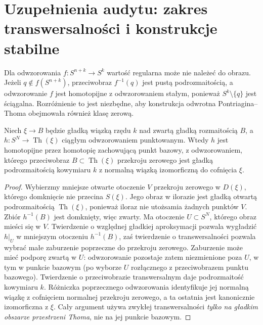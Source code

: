 \section{Uzupełnienia audytu: zakres transwersalności i konstrukcje stabilne}
\begin{uwaga}
Dla odwzorowania $f:S^{n+k}\to S^k$ wartość regularna może nie należeć
do obrazu. Jeżeli $q\notin f(S^{n+k})$, przeciwobraz $f^{-1}(q)$
jest pustą podrozmaitością, a odwzorowanie $f$ jest homotopijne z odwzorowaniem stałym,
ponieważ $S^k\setminus\{q\}$ jest ściągalna. Rozróżnienie
to jest niezbędne, aby konstrukcja odwrotna Pontriagina--Thoma
obejmowała również klasę zerową.
\end{uwaga}

\begin{lemat}
\label{lem:thom-transversal-v9-audyt}
Niech $\xi\to B$ będzie gładką wiązką rzędu $k$ nad zwartą
gładką rozmaitością $B$, a $h:S^N\to\operatorname{Th}(\xi)$
ciągłym odwzorowaniem punktowanym. Wtedy $h$ jest
homotopijne przez homotopię zachowującą punkt bazowy,
z odwzorowaniem, którego przeciwobraz $B\subset\operatorname{Th}(\xi)$
przekroju zerowego jest gładką podrozmaitością
kowymiaru $k$ z normalną wiązką izomorficzną do
cofnięcia $\xi$.
\end{lemat}
\begin{proof}
Wybierzmy mniejsze otwarte otoczenie $V$ przekroju zerowego
w $D(\xi)$, którego domknięcie nie przecina $S(\xi)$.
Jego obraz w ilorazie jest gładką otwartą podrozmaitością
$\operatorname{Th}(\xi)$, ponieważ iloraz nie utożsamia
żadnych punktów $V$. Zbiór $h^{-1}(B)$ jest domknięty,
więc zwarty. Ma otoczenie $U\subset S^N$, którego
obraz mieści się w $V$. Twierdzenie o względnej gładkiej
aproksymacji pozwala wygładzić $h|_U$ w mniejszym
otoczeniu $h^{-1}(B)$, zaś twierdzenie o transwersalności
pozwala wybrać małe zaburzenie poprzeczne do przekroju
zerowego. Zaburzenie może mieć podporę zwartą w $U$:
odwzorowanie pozostaje zatem niezmienione poza $U$, w tym w punkcie bazowym
(po wyborze $U$ rozłącznego z przeciwobrazem punktu bazowego). Twierdzenie o przeciwobrazie
transwersalnym daje podrozmaitość kowymiaru $k$.
Różniczka poprzecznego odwzorowania identyfikuje jej
normalną wiązkę z cofnięciem normalnej przekroju
zerowego, a ta ostatnia jest kanonicznie izomorficzna
z $\xi$. Cały argument używa zwykłej transwersalności
\emph{tylko na gładkim obszarze przestrzeni Thoma},
nie na jej punkcie bazowym.
\end{proof}

